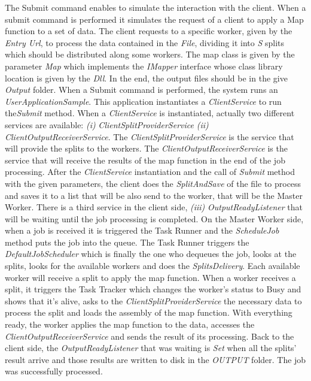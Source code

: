 \documentclass[times, 10pt,twocolumn]{article}
\begin{document}
            The Submit command enables to simulate the interaction with the client. When a submit command is performed it simulates the request of a client to apply a Map function to a set of data. The client requests to a specific worker, given by the \emph{Entry Url}, to process the data contained in the \emph{File}, dividing it into \emph{S} splits which should be distributed along some workers. The map class is given by the parameter \emph{Map} which implements the \emph{IMapper} interface whose class library location is given by the \emph{Dll}. In the end, the output files should be in the give \emph{Output} folder. When a Submit command is performed, the system runs an \emph{UserApplicationSample}. This application instantiates a \emph{ClientService} to run the\emph{Submit} method. When a \emph{ClientService} is instantiated, actually two different services are available: {\it (i)} \emph{ClientSplitProviderService} {\it (ii)} \emph{ClientOutputReceiverService}. The \emph{ClientSplitProviderService} is the service that will provide the splits to the workers. The \emph{ClientOutputReceiverService} is the service that will receive the results of the map function in the end of the job processing.
            After the \emph{ClientService} instantiation and the call of \emph{Submit} method with the given parameters, the client does the \emph{SplitAndSave} of the file to process and saves it to a list that will be also send to the worker, that will be the Master Worker.
            There is a third service in the client side, {\it (iii)} \emph{OutputReadyListener} that will be waiting until the job processing is completed.
            On the Master Worker side, when a job is received it is triggered the Task Runner and the \emph{ScheduleJob} method puts the job into the queue. The Task Runner triggers the \emph{DefaultJobScheduler} which is finally the one who dequeues the job, looks at the splits, looks for the available workers and does the \emph{SplitsDelivery}.
            Each available worker will receive a split to apply the map function. When a worker receives a split, it triggers the Task Tracker which changes the worker's status to Busy and shows that it's alive, asks to the \emph{ClientSplitProviderService} the necessary data to process the split and loads the assembly of the map function. With everything ready, the worker applies the map function to the data, accesses the \emph{ClientOutputReceiverService} and sends the result of its processing.
            Back to the client side, the \emph{OutputReadyListener} that was waiting is \emph{Set} when all the splits' result arrive and those results are written to disk in the \emph{OUTPUT} folder. The job was successfully processed.
\end{document}
